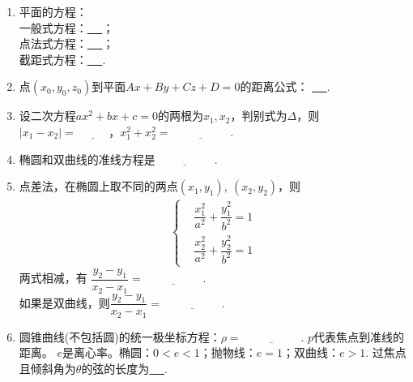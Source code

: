 \documentclass{article}
\newif\ifte
\newcommand{\q}{\quad}
\begin{document}
\begin{multicols}{2}
\begin{enumerate}[leftmargin=20pt]
\item 平面的方程：\\
一般式方程：\underline{\ \ifte $ Ax+By+Cz+D=0 $
    \else \hspace{4cm} \fi\ }；\\
点法式方程：\underline{\ \ifte $ A(x-x_0)+B(y-y_0)+C(z-z_0)=0 $
    \else \hspace{4cm} \fi\ }；\\
截距式方程：\underline{\ \ifte $ \dfrac{x}{a}+\dfrac{y}{b}+
    \dfrac{z}{c}=1 $\else \hspace{4cm} \fi\ }.

\item 点$ (x_0,y_0,z_0) $到平面$ Ax+By+Cz+D=0 $的距离公式：
\underline{\ \ifte $ \dfrac{|Ax_0+By_0+Cz_0+D|}{\sqrt{A^2+B^2+C^2}} $
    \else \hspace{4cm} \fi\ }.

\item 设二次方程$ ax^2+bx+c=0 $的两根为$ x_1,x_2 $，判别式为$ \Delta $，则
$ |x_1-x_2|=\underline{\ \ifte \dfrac{\sqrt{\Delta}}{|a|}
    \else \hspace{1cm} \fi\ } $，$ x_1^2+x_2^2=\underline{\ \ifte 
    \dfrac{b^2-2ac}{a^2}\else \hspace{2cm} \fi\ } $.

\item 椭圆和双曲线的准线方程是$ \underline{\ \ifte 
   x=\pm \dfrac{a^2}{c} \else \hspace{2cm} \fi\ } $.

\item 点差法，在椭圆上取不同的两点$ (x_1,y_1),\ (x_2,y_2) $，则
\begin{align*}
    \left\{\begin{aligned}
        & \dfrac{x_1^2}{a^2}+\dfrac{y_1^2}{b^2}=1 \\
        & \dfrac{x_2^2}{a^2}+\dfrac{y_2^2}{b^2}=1 
    \end{aligned}\right.
\end{align*}
两式相减，有
$ \dfrac{y_2-y_1}{x_2-x_1}=\underline{\ \ifte 
 -\dfrac{b^2(x_2+x_1)}{y_2+y_1}\else \hspace{2cm} \fi\ } $. \\
如果是双曲线，则$ \dfrac{y_2-y_1}{x_2-x_1}=\underline{\ \ifte 
\dfrac{b^2(x_2+x_1)}{y_2+y_1}\else \hspace{2cm} \fi\ } $.

\item 圆锥曲线(不包括圆)的统一极坐标方程：$\rho= \underline{\ \ifte 
  \dfrac{ep}{1-e\cos \theta} \else \hspace{2cm} \fi\ } $. \q
$ p $代表焦点到准线的距离。
$ e $是离心率。椭圆：$ 0<e<1 $；抛物线：$ e=1 $；双曲线：$ e>1 $.
过焦点且倾斜角为$ \theta $的弦的长度为\underline{\ \ifte 
$ \dfrac{2ep}{1-e^2\cos^2 \theta} $\else \hspace{2cm} \fi\ }.


\end{enumerate}
\end{multicols}
\end{document}
